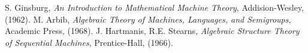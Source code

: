 \documentclass[12pt]{article}
\begin{document}
\begin{thebibliography}{8}
 S. Ginsburg, {\em An Introduction to Mathematical Machine Theory}, Addision-Wesley, (1962).
 M. Arbib, \emph{Algebraic Theory of Machines, Languages, and Semigroups}, Academic Press, (1968).
 J. Hartmanis, R.E. Stearns, \emph{Algebraic Structure Theory of Sequential Machines}, Prentice-Hall, (1966).
\end{thebibliography}
\end{document}
